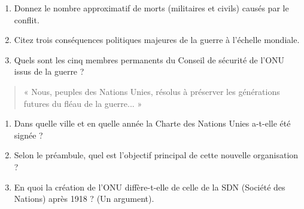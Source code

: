 \documentclass[11pt]{article}
\begin{document}
\begin{exercice}
\begin{enumerate}
    \item Donnez le nombre approximatif de morts (militaires et civils) causés par le conflit.
    \item Citez trois conséquences politiques majeures de la guerre à l'échelle mondiale.
    \item Quels sont les cinq membres permanents du Conseil de sécurité de l'ONU issus de la guerre ?
\end{enumerate}
\end{exercice}

\begin{exercice}
\begin{quote}
    « Nous, peuples des Nations Unies, résolus à préserver les générations futures du fléau de la guerre... »
\end{quote}
\begin{enumerate}
    \item Dans quelle ville et en quelle année la Charte des Nations Unies a-t-elle été signée ?
    \item Selon le préambule, quel est l'objectif principal de cette nouvelle organisation ?
    \item En quoi la création de l'ONU diffère-t-elle de celle de la SDN (Société des Nations) après 1918 ? (Un argument).
\end{enumerate}
\end{exercice}
\end{document}
